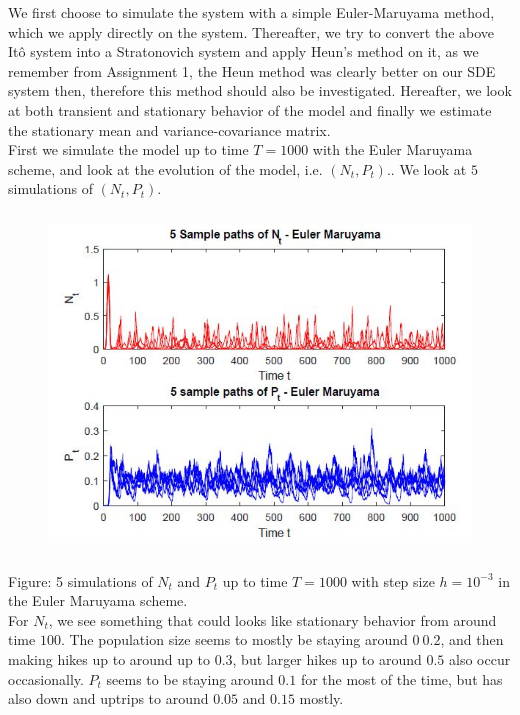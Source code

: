 \documentclass[a4paper,12pt]{article}
\begin{document}
We first choose to simulate the system with a simple Euler-Maruyama method, which we apply directly on the system. Thereafter, we try to convert the above It\^{o} system into a Stratonovich system and apply Heun's method on it, as we remember from Assignment 1, the Heun method was clearly better on our SDE system then, therefore this method should also be investigated. Hereafter, we look at both transient and stationary behavior of the model and finally we estimate the stationary mean and variance-covariance matrix.\\


First we simulate the model up to time $T=1000$ with the Euler Maruyama scheme, and look at the evolution of the model, i.e. $(N_t,P_t)$.. We look at $5$ simulations of $(N_t,P_t)$.

\FloatBarrier
\begin{figure}[ht]
	\begin{center}
		\includegraphics[height=9cm]{5simEM.JPG}
		\label{fig:23}
	\end{center}
\end{figure}
\FloatBarrier

Figure: 5 simulations of $N_t$ and $P_t$ up to time $T=1000$ with step size $h=10^{-3}$ in the Euler Maruyama scheme.\\

For $N_t$, we see something that could looks like stationary behavior from around time $100$. The population size seems to mostly be staying around $0~0.2$, and then making hikes up to around up to $0.3$, but larger hikes up to around $0.5$ also occur occasionally. $P_t$ seems to be staying around $0.1$ for the most of the time, but has also down and uptrips to around $0.05$ and $0.15$ mostly.
\end{document}
